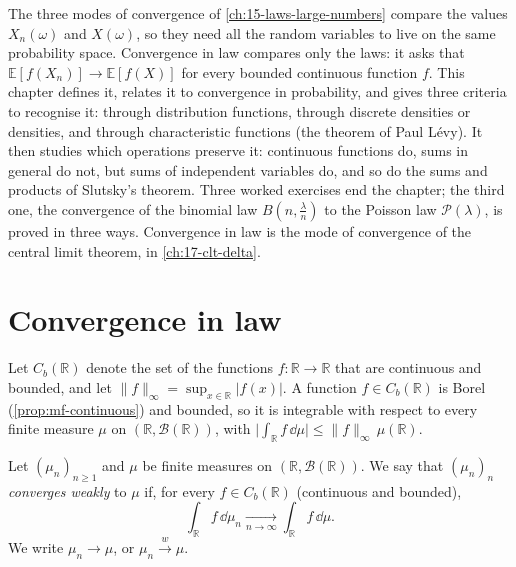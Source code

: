 
The three modes of convergence of \cref{ch:15-laws-large-numbers} compare the values
$X_n(\omega)$ and $X(\omega)$, so they need all the random variables to live on the same
probability space. Convergence in law compares only the laws: it asks that
$\mathbb E[f(X_n)]\to\mathbb E[f(X)]$ for every bounded continuous function $f$. This chapter
defines it, relates it to convergence in probability, and gives three criteria to recognise it:
through distribution functions, through discrete densities or densities, and through
characteristic functions (the theorem of Paul L\'evy). It then studies which operations
preserve it: continuous functions do, sums in general do not, but sums of independent
variables do, and so do the sums and products of Slutsky's theorem. Three worked exercises end
the chapter; the third one, the convergence of the binomial law $B(n,\frac\lambda n)$ to the
Poisson law $\mathcal P(\lambda)$, is proved in three ways. Convergence in law is the mode of
convergence of the central limit theorem, in \cref{ch:17-clt-delta}.

\section{Convergence in law}\label{sec:cl-definition}

Let $C_b(\mathbb R)$ denote the set of the functions $f:\mathbb R\to\mathbb R$ that are
continuous and bounded, and let $\|f\|_\infty=\sup_{x\in\mathbb R}|f(x)|$. A function
$f\in C_b(\mathbb R)$ is Borel (\cref{prop:mf-continuous}) and bounded, so it is integrable with
respect to every finite measure $\mu$ on $(\mathbb R,\mathcal B(\mathbb R))$, with
$\big|\int_{\mathbb R}f\,\dd\mu\big|\le\|f\|_\infty\,\mu(\mathbb R)$.

\begin{definition}\label{def:cl-weak-convergence}
Let $(\mu_n)_{n\ge1}$ and $\mu$ be finite measures on $(\mathbb R,\mathcal B(\mathbb R))$. We
say that $(\mu_n)_n$ \emph{converges weakly} to $\mu$ if, for every $f\in C_b(\mathbb R)$
(continuous and bounded),
\[
  \int_{\mathbb R}f\,\dd\mu_n\xrightarrow[n\to\infty]{}\int_{\mathbb R}f\,\dd\mu .
\]
We write $\mu_n\to\mu$, or $\mu_n\xrightarrow{w}\mu$.
\end{definition}


